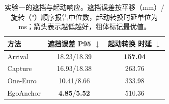 \begin{table}[t]
\centering
\caption{实验一的遮挡与起动响应。遮挡误差按平移（mm）/旋转（°）顺序报告中位数，起动转换时延单位为ms；箭头表示越低越好，粗体标记最优值。}
\label{tab:exp1-recovery}
\setlength{\tabcolsep}{4.0pt}
\renewcommand{\arraystretch}{1.10}
\begin{tabular}{@{}lcc@{}}
\toprule
方法 &
\shortstack{遮挡误差\\P95 $\downarrow$} &
\shortstack{起动转换\\时延 $\downarrow$} \\
\midrule
Arrival   & 18.23/18.39 & \textbf{157.04} \\
Capture   & 16.93/18.38 & 263.76 \\
One-Euro  & 10.41/8.66 & 333.98 \\
EgoAnchor & \textbf{4.85}/\textbf{5.52} & 510.36 \\
\bottomrule
\end{tabular}
\end{table}
